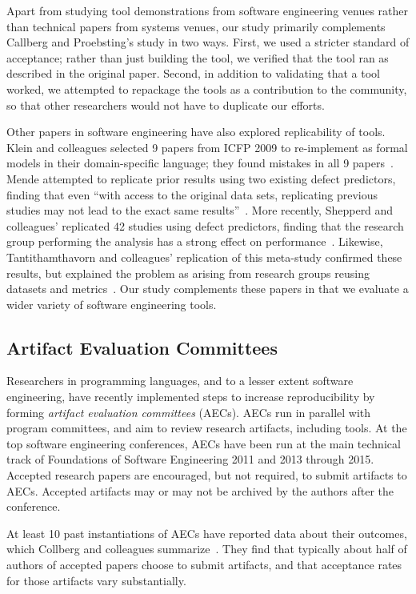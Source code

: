 \documentclass[10pt,conference]{IEEEtran}
\begin{document}
\noindent
Apart from studying tool demonstrations from software engineering venues
rather than technical papers from systems venues,
our study primarily complements Callberg and Proebsting's study in two
ways.
First, we used a stricter standard of acceptance; rather than just building
the tool, we verified that the tool ran as described in the original paper.
Second, in addition to validating that a tool worked, we attempted to 
repackage the tools as a contribution to the community, so that other
researchers would not have to duplicate our efforts. 

Other papers in software engineering have also explored 
replicability of tools.
Klein and colleagues selected 9 papers from ICFP 2009 to
re-implement as formal models in their domain-specific language;
they found mistakes in all 9 papers~\cite{klein2012run}.
Mende attempted to replicate prior results using two 
existing defect predictors, finding that even
``with access to the original data sets, replicating
previous studies may not lead to the exact same results''~\cite{mende2010replication}.
More recently, Shepperd and colleagues' replicated 42 studies 
using defect predictors, finding that the research group 
performing the analysis has a strong effect on performance~\cite{shepperd}.
Likewise, Tantithamthavorn and colleagues' replication of this meta-study
confirmed these results, but explained the problem as arising from 
research groups reusing datasets and metrics~\cite{tantithamthavorn}.
Our study complements these papers in that we evaluate a wider
variety of software engineering tools.

\subsection{Artifact Evaluation Committees}

Researchers in programming languages, and to a lesser extent
software engineering, have recently implemented steps
to increase reproducibility by forming
\emph{artifact evaluation committees} (AECs).
AECs run in parallel with program committees,
and aim to review research artifacts, including tools.
At the top software engineering conferences,
AECs have been run at the main technical track of 
Foundations of Software Engineering 2011 and 2013 through 2015.
Accepted research papers are encouraged, but not required, to 
submit artifacts to AECs.
Accepted artifacts may or may not be archived by 
the authors after the conference.

At least 10 past instantiations of AECs have reported data about 
their outcomes, which Collberg and colleagues summarize~\cite{proebsting2015repeatability}.
They find that typically about half of authors of accepted papers
choose to submit artifacts, and that acceptance rates for those
artifacts vary substantially.
\end{document}
